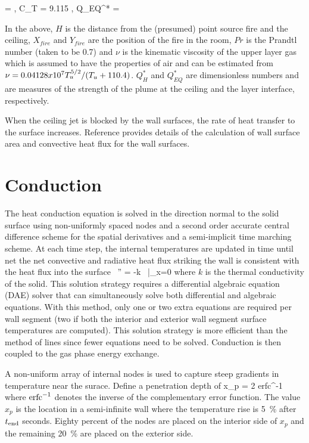 \be \sigma = 
\; , \;
C_T = 9.115
\; , \;
Q_{EQ}^* =  \ee

In the above, $H$ is the distance from the (presumed) point source fire and the ceiling, $X_{fire}$  and $Y_{fire}$ are the position of the fire in the room, $Pr$ is the Prandtl number (taken to be 0.7) and $\nu$ is the kinematic viscosity of the upper layer gas which is assumed to have the properties of air and can
be estimated from $\nu = 0.04128 x 10^7 T_u^{5/2} /{ \left( {T_u + 110.4} \right) }$. $Q_H^*$ and $Q_{EQ}^*$ are dimensionless numbers and are measures of the strength of the plume at the ceiling and the layer interface, respectively.

When the ceiling jet is blocked by the wall surfaces, the rate of heat transfer to the surface increases.  Reference \cite{Cooper:1991} provides details of the calculation of wall surface area and convective heat flux for the wall surfaces.

 \section{Conduction}

The heat conduction equation is solved in the direction normal to the solid surface using non-uniformly spaced nodes and a second order accurate central difference scheme for the spatial derivatives and a semi-implicit time marching scheme. At each time step, the internal temperatures are updated in time until net the net convective and radiative heat flux striking the wall is consistent with the heat flux into the surface~\cite{Moss:1992}
\be 
   \dq'' = -k \,  \Big|_{x=0} 
\ee
where $k$ is the thermal conductivity of the solid.  This solution strategy requires a differential algebraic equation (DAE) solver that can simultaneously solve both differential and algebraic equations.  With this method, only one or two extra equations are required per wall segment (two if both the interior and exterior wall segment surface temperatures are computed).  This solution strategy is more efficient than the method of lines since fewer equations need to be solved. Conduction is then coupled to the gas phase energy exchange.  

A non-uniform array of internal nodes is used to capture steep gradients in temperature near the surace. Define a penetration depth of
\be
   x_p = 2  \; \hbox{erfc}^{-1} 
\ee
where $\hbox{erfc}^{-1}$ denotes the inverse of the complementary error function. The value $x_p$ is the location in a semi-infinite wall where the temperature rise is 5~\% after $t_{\rm end}$ seconds. Eighty percent of the nodes are placed on the interior side of $x_p$ and the remaining 20~\% are placed on the exterior side.

